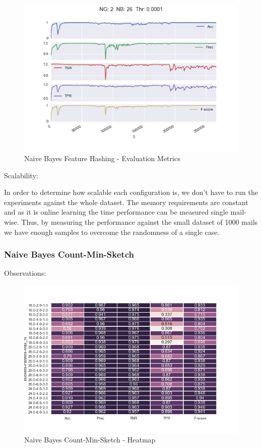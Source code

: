 \documentclass[12pt]{article}
\begin{document}
\begin{figure}[h]
    \centering
    \includegraphics[scale=0.8]{./SpamFilter/code/nbfhcurve}
    \caption{Naive Bayes Feature Hashing - Evaluation Metrics}
    \label{nbfhc}
\end{figure}



Scalability:
    
     In order to determine how scalable each configuration is, we don't have to run the experiments against the whole dataset. The memory requirements are constant and as it is online learning the time performance can be measured single mail-wise. Thus, by measuring the performance against the small dataset of 1000 mails we have enough samples to overcome the randomness of a single case. 
   
      



\subsubsection{Naive Bayes Count-Min-Sketch}

Observations:

\begin{figure}[h]
    \centering
    \includegraphics[scale=0.8]{./SpamFilter/code/nbcms}
    \caption{Naive Bayes Count-Min-Sketch - Heatmap}
    \label{nbcms}
\end{figure}
\end{document}
